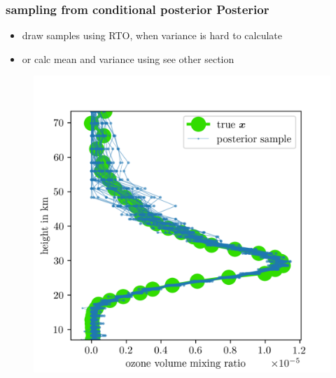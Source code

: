 \subsubsection{sampling from conditional posterior Posterior}
\begin{itemize}
	\item draw samples using RTO, when variance is hard to calculate
	\item or calc mean and variance using see other section
\end{itemize}
\begin{figure}[ht!]
	\centering
	\includegraphics{FirstTestRes.png}
	\caption[]{}
	\label{fig:}
\end{figure}


